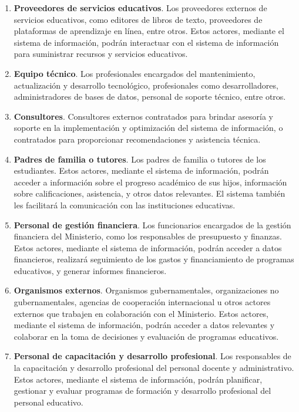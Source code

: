 \documentclass[9pt,a4paper]{IEEEtran}
\begin{document}
\begin{enumerate}
	\item \textbf{Proveedores de servicios educativos}. Los proveedores externos de servicios educativos, como editores de libros de texto, proveedores de plataformas de aprendizaje en l\'inea, entre otros. Estos actores, mediante el sistema de informaci\'on, podr\'an interactuar con el sistema de informaci\'on para suministrar recursos y servicios educativos.

	\item \textbf{Equipo t\'ecnico}. Los profesionales encargados del mantenimiento, actualizaci\'on y desarrollo tecnol\'ogico, profesionales como desarrolladores, administradores de bases de datos, personal de soporte t\'ecnico, entre otros.

	\item \textbf{Consultores}. Consultores externos contratados para brindar asesor\'ia y soporte en la implementaci\'on y optimizaci\'on del sistema de informaci\'on, o contratados para proporcionar recomendaciones y asistencia t\'ecnica.

	\item \textbf{Padres de familia o tutores}. Los padres de familia o tutores de los estudiantes. Estos actores, mediante el sistema de informaci\'on, podr\'an acceder a informaci\'on sobre el progreso acad\'emico de sus hijos, informaci\'on sobre calificaciones, asistencia, y otros datos relevantes. El sistema tambi\'en les facilitar\'a la comunicaci\'on con las instituciones educativas.

	\item \textbf{Personal de gesti\'on financiera}. Los funcionarios encargados de la gesti\'on financiera del Ministerio, como los responsables de presupuesto y finanzas. Estos actores, mediante el sistema de informaci\'on, podr\'an acceder a datos financieros, realizar\'a seguimiento de los gastos y financiamiento de programas educativos, y generar informes financieros.

	\item \textbf{Organismos externos}. Organismos gubernamentales, organizaciones no gubernamentales, agencias de cooperaci\'on internacional u otros actores externos que trabajen en colaboraci\'on con el Ministerio. Estos actores, mediante el sistema de informaci\'on, podr\'an acceder a datos relevantes y colaborar en la toma de decisiones y evaluaci\'on de programas educativos.

	\item \textbf{Personal de capacitaci\'on y desarrollo profesional}. Los responsables de la capacitaci\'on y desarrollo profesional del personal docente y administrativo. Estos actores, mediante el sistema de informaci\'on, podr\'an planificar, gestionar y evaluar programas de formaci\'on y desarrollo profesional del personal educativo.


\end{enumerate}
\end{document}
